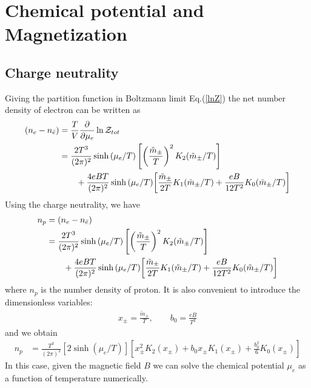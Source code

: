 \documentclass[Universe,article,submit,moreauthors,pdftex]{Definitions/mdpi}
\begin{document}
\section{Chemical potential and Magnetization}


\subsection{Charge neutrality}
Giving the partition function in Boltzmann limit Eq.(\ref{lnZ}) the net number density of electron can be written as
\begin{align}
\left(n_e-n_{\bar e}\right)&=\frac{T}{V}\frac{\partial}{\partial \mu_e}\ln\mathcal{Z}_{tot}\notag\\
&=\frac{2T^3}{(2\pi)^2}\sinh{(\mu_e/T)}\left[\left(\frac{\tilde{m}_\pm}{T}\right)^2K_2(\tilde m_\pm/T)\right]\notag\\&
\qquad+\frac{4eBT}{(2\pi)^2}\sinh{(\mu_e/T)}\bigg[\frac{\tilde{m}_\pm}{2T}K_1(\tilde m_\pm/T)+\frac{eB}{12T^2}K_0(\tilde m_\pm/T)\bigg]
\end{align}
Using the charge neutrality, we have
\begin{align}
n_p&=\left(n_e-n_{\bar e}\right)\notag\\
&=\frac{2T^3}{(2\pi)^2}\sinh{(\mu_e/T)}\left[\left(\frac{\tilde{m}_\pm}{T}\right)^2K_2(\tilde m_\pm/T)\right]\notag\\
&\qquad+\frac{4eBT}{(2\pi)^2}\sinh{(\mu_e/T)}\bigg[\frac{\tilde{m}_\pm}{2T}K_1(\tilde m_\pm/T)+\frac{eB}{12T^2}K_0(\tilde m_\pm/T)\bigg]
\end{align}
where $n_p$ is the number density of proton. It is also convenient to introduce the dimensionless variables:
\begin{align}
x_\pm=\frac{\tilde m_\pm}{T},\qquad b_0=\frac{eB}{T^2}
\end{align}
and we obtain
\begin{align}
n_p&=\frac{T^3}{(2\pi)^2}\left[2\sinh{(\mu_e/T)}\right]\left[x_\pm^2K_2(x_\pm)+b_0x_\pm K_1(x_\pm)+\frac{b^2_0}{6}K_0(x_\pm)\right]
\end{align}
In this case, given the magnetic field $B$ we can solve the chemical potential $\mu_e$ as a function of temperature numerically.

\end{document}
